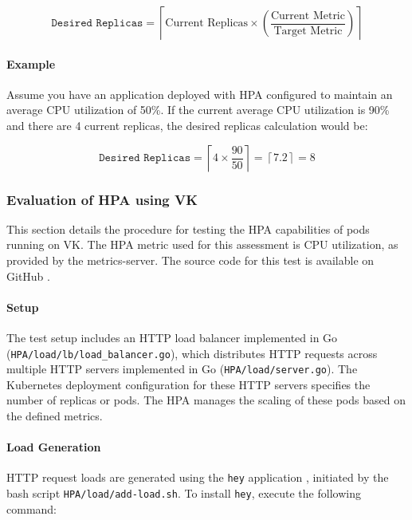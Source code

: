 \begin{equation}
\texttt{Desired Replicas} = \left\lceil \text{Current Replicas} \times \left( \frac{\text{Current Metric}}{\text{Target Metric}} \right) \right\rceil
\end{equation}

\paragraph{Example}

Assume you have an application deployed with HPA configured to maintain an average CPU utilization of 50\%. If the current average CPU utilization is 90\% and there are 4 current replicas, the desired replicas calculation would be:

\begin{equation}
\texttt{Desired Replicas} = \left\lceil 4 \times \frac{90}{50} \right\rceil = \left\lceil 7.2 \right\rceil = 8
\end{equation}

\subsubsection{Evaluation of HPA using VK}

This section details the procedure for testing the HPA capabilities of pods running on VK. The HPA metric used for this assessment is CPU utilization, as provided by the metrics-server. The source code for this test is available on GitHub \cite{autoscaling-jiriaf}.

\paragraph{Setup}

The test setup includes an HTTP load balancer implemented in Go (\texttt{HPA/load/lb/load\_balancer.go}), which distributes HTTP requests across multiple HTTP servers implemented in Go (\texttt{HPA/load/server.go}). The Kubernetes deployment configuration for these HTTP servers specifies the number of replicas or pods. The HPA manages the scaling of these pods based on the defined metrics.

\paragraph{Load Generation}

HTTP request loads are generated using the \texttt{hey} application \cite{hey}, initiated by the bash script \texttt{HPA/load/add-load.sh}. To install \texttt{hey}, execute the following command:

